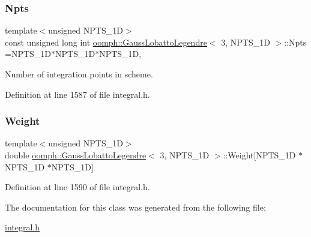 \subsubsection{\texorpdfstring{Npts}{Npts}}
{\footnotesize\ttfamily template$<$unsigned N\+P\+T\+S\+\_\+1D$>$ \\
const unsigned long int \hyperlink{classoomph_1_1GaussLobattoLegendre}{oomph\+::\+Gauss\+Lobatto\+Legendre}$<$ 3, N\+P\+T\+S\+\_\+1D $>$\+::Npts =N\+P\+T\+S\+\_\+1D$\ast$N\+P\+T\+S\+\_\+1D$\ast$N\+P\+T\+S\+\_\+1D\hspace{0.3cm}{\ttfamily [static]}, {\ttfamily [private]}}



Number of integration points in scheme. 



Definition at line 1587 of file integral.\+h.

\mbox{\label{classoomph_1_1GaussLobattoLegendre_3_013_00_01NPTS__1D_01_4_a76673329c738e81bb440af2a59b3f922}} 
\subsubsection{\texorpdfstring{Weight}{Weight}}
{\footnotesize\ttfamily template$<$unsigned N\+P\+T\+S\+\_\+1D$>$ \\
double \hyperlink{classoomph_1_1GaussLobattoLegendre}{oomph\+::\+Gauss\+Lobatto\+Legendre}$<$ 3, N\+P\+T\+S\+\_\+1D $>$\+::Weight\mbox{[}N\+P\+T\+S\+\_\+1D $\ast$N\+P\+T\+S\+\_\+1D $\ast$N\+P\+T\+S\+\_\+1D\mbox{]}\hspace{0.3cm}{\ttfamily [private]}}



Definition at line 1590 of file integral.\+h.



The documentation for this class was generated from the following file\+:\begin{DoxyCompactItemize}
\item 
\hyperlink{integral_8h}{integral.\+h}\end{DoxyCompactItemize}
